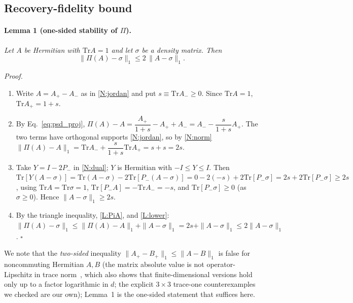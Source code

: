 \documentclass[pra,twocolumn,superscriptaddress,longbibliography,floatfix,nofootinbib]{revtex4-2}
\newcommand{\tr}{\mathrm{Tr}}
\begin{document}
\subsection{Recovery-fidelity bound}
\label{sec:lipschitz_proof}

\paragraph{Lemma 1 (one-sided stability of $\Pi$).}
\label{lemma:lipschitz}
\textit{Let $A$ be Hermitian with $\tr A = 1$ and let $\sigma$ be a density matrix. Then}
\begin{equation}
\|\Pi(A) - \sigma\|_1 \leq 2\,\|A - \sigma\|_1 .
\label{eq:lemma1}
\end{equation}

\noindent\textit{Proof.}
\begin{enumerate}[label=(L\arabic*),leftmargin=3em]
\item \label{L:setup} Write $A = A_+ - A_-$ as in \ref{N:jordan} and put $s \equiv \tr A_- \geq 0$. Since $\tr A = 1$, $\tr A_+ = 1 + s$.
\item \label{L:PiA} By Eq.~\eqref{eq:psd_proj}, $\Pi(A) - A = \dfrac{A_+}{1+s} - A_+ + A_- = A_- - \dfrac{s}{1+s}A_+$.
The two terms have orthogonal supports \ref{N:jordan}, so by \ref{N:norm}
$\|\Pi(A) - A\|_1 = \tr A_- + \dfrac{s}{1+s}\tr A_+ = s + s = 2s$.
\item \label{L:lower} Take $Y = I - 2P_-$ in \ref{N:dual}; $Y$ is Hermitian with $-I \leq Y \leq I$. Then
$\tr[Y(A - \sigma)] = \tr(A - \sigma) - 2\tr[P_-(A - \sigma)] = 0 - 2(-s) + 2\tr[P_-\sigma] = 2s + 2\tr[P_-\sigma] \geq 2s$,
using $\tr A = \tr\sigma = 1$, $\tr[P_- A] = -\tr A_- = -s$, and $\tr[P_-\sigma] \geq 0$ (as $\sigma \geq 0$). Hence $\|A - \sigma\|_1 \geq 2s$.
\item \label{L:tri} By the triangle inequality, \ref{L:PiA}, and \ref{L:lower}:
$\|\Pi(A) - \sigma\|_1 \leq \|\Pi(A) - A\|_1 + \|A - \sigma\|_1 = 2s + \|A - \sigma\|_1 \leq 2\|A - \sigma\|_1$. \hfill$\square$
\end{enumerate}
We note that the \emph{two-sided} inequality $\|A_+ - B_+\|_1 \leq \|A - B\|_1$ is false for noncommuting Hermitian $A,B$ (the matrix absolute value is not operator-Lipschitz in trace norm~\cite{Davies1988}, which also shows that finite-dimensional versions hold only up to a factor logarithmic in $d$; the explicit $3\times3$ trace-one counterexamples we checked are our own); Lemma~1 is the one-sided statement that suffices here.
\end{document}
